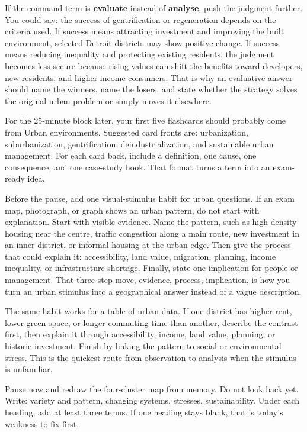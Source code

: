 \documentclass[11pt,a4paper]{article}
\newcommand{\exam}[1]{\textcolor{AccentTeal}{\textbf{#1}}}
\begin{document}
If the command term is \exam{evaluate} instead of \exam{analyse}, push the
judgment further. You could say: the success of gentrification or regeneration
depends on the criteria used. If success means attracting investment and
improving the built environment, selected Detroit districts may show positive
change. If success means reducing inequality and protecting existing residents,
the judgment becomes less secure because rising values can shift the benefits
toward developers, new residents, and higher-income consumers. That is why an
evaluative answer should name the winners, name the losers, and state whether
the strategy solves the original urban problem or simply moves it elsewhere.

For the 25-minute block later, your first five flashcards should probably come
from Urban environments. Suggested card fronts are: urbanization,
suburbanization, gentrification, deindustrialization, and sustainable urban
management. For each card back, include a definition, one cause, one consequence,
and one case-study hook. That format turns a term into an exam-ready idea.

Before the pause, add one visual-stimulus habit for urban questions. If an exam
map, photograph, or graph shows an urban pattern, do not start with explanation.
Start with visible evidence. Name the pattern, such as high-density housing near
the centre, traffic congestion along a main route, new investment in an inner
district, or informal housing at the urban edge. Then give the process that
could explain it: accessibility, land value, migration, planning, income
inequality, or infrastructure shortage. Finally, state one implication for
people or management. That three-step move, evidence, process, implication, is
how you turn an urban stimulus into a geographical answer instead of a vague
description.

The same habit works for a table of urban data. If one district has higher rent,
lower green space, or longer commuting time than another, describe the contrast
first, then explain it through accessibility, income, land value, planning, or
historic investment. Finish by linking the pattern to social or environmental
stress. This is the quickest route from observation to analysis when the
stimulus is unfamiliar.

Pause now and redraw the four-cluster map from memory. Do not look back yet.
Write: variety and pattern, changing systems, stresses, sustainability. Under
each heading, add at least three terms. If one heading stays blank, that is
today's weakness to fix first.
\end{document}
